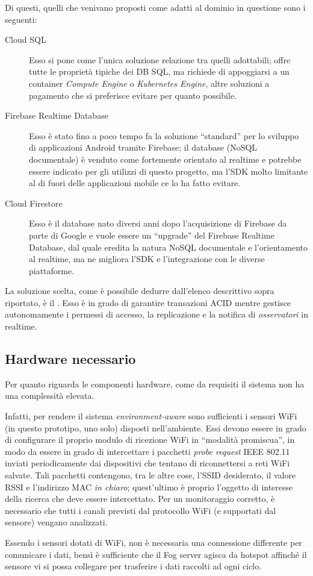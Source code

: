 Di questi, quelli che venivano proposti come adatti al dominio in questione sono i seguenti:

\begin{description}
  \item[Cloud SQL\footnotemark]
    Esso si pone come l'unica soluzione relazione tra quelli adottabili;
    offre tutte le proprietà tipiche dei DB SQL, ma richiede di appoggiarsi a un container \emph{Compute Engine} o \emph{Kubernetes Engine}, altre soluzioni a pagamento che si preferisce evitare per quanto possibile.
  \item[Firebase Realtime Database\footnotemark]
    Esso è stato fino a poco tempo fa la soluzione ``standard'' per lo sviluppo di applicazioni Android tramite Firebase;
    il database (NoSQL documentale) è venduto come fortemente orientato al realtime e potrebbe essere indicato per gli utilizzi di questo progetto, ma l'SDK molto limitante al di fuori delle applicazioni mobile ce lo ha fatto evitare.
  \item[Cloud Firestore\footnotemark]
    Esso è il database nato diversi anni dopo l'acquisizione di Firebase da parte di Google e vuole essere un ``upgrade'' del Firebase Realtime Database, dal quale eredita la natura NoSQL documentale e l'orientamento al realtime, ma ne migliora l'SDK e l'integrazione con le diverse piattaforme.
\end{description}

La soluzione scelta, come è possibile dedurre dall'elenco descrittivo sopra riportato, è il .
Esso è in grado di garantire transazioni ACID mentre gestisce autonomamente i permessi di accesso, la replicazione e la notifica di \emph{osservatori} in realtime.

\subsection{Hardware necessario}

Per quanto riguarda le componenti hardware, come da requisiti il sistema non ha una complessità elevata.

Infatti, per rendere il sistema \emph{environment-aware} sono sufficienti i sensori WiFi (in questo prototipo, uno solo) disposti nell'ambiente.
Essi devono essere in grado di configurare il proprio modulo di ricezione WiFi in ``modalità promiscua'',
in modo da essere in grado di intercettare i pacchetti \emph{probe request} IEEE 802.11 inviati periodicamente dai dispositivi che tentano di riconnettersi a reti WiFi salvate.
Tali pacchetti contengono, tra le altre cose, l'SSID desiderato, il valore RSSI e l'indirizzo MAC \emph{in chiaro};
quest'ultimo è proprio l'oggetto di interesse della ricerca che deve essere intercettato.
Per un monitoraggio corretto, è necessario che tutti i canali previsti dal protocollo WiFi (e supportati dal sensore) vengano analizzati.

Essendo i sensori dotati di WiFi, non è necessaria una connessione differente per comunicare i dati,
bensì è sufficiente che il Fog server agisca da hotspot affinché il sensore vi si possa collegare per trasferire i dati raccolti ad ogni ciclo.
